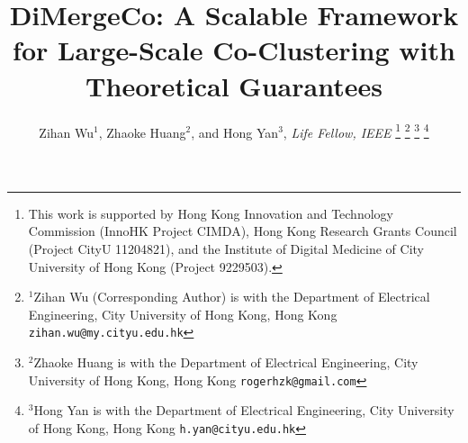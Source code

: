 \documentclass[journal]{IEEEtran}
\theoremstyle{definition}
\theoremstyle{remark} %
\begin{document}
\title{\LARGE \bf DiMergeCo: A Scalable Framework for Large-Scale Co-Clustering with Theoretical Guarantees}


\author{Zihan Wu$^{1}$, Zhaoke Huang$^{2}$, and Hong Yan$^{3}$, \textit{Life Fellow, IEEE}%
    \thanks{This work is supported by Hong Kong Innovation and
        Technology Commission (InnoHK Project CIMDA), Hong
        Kong Research Grants Council (Project CityU 11204821), and the Institute of Digital Medicine of City University of Hong Kong (Project 9229503). }%
    \thanks{$^{1}$Zihan Wu (Corresponding Author) is with the Department of Electrical Engineering,
        City University of Hong Kong, Hong Kong
            {\tt\small zihan.wu@my.cityu.edu.hk}}%
    \thanks{$^{2}$Zhaoke Huang is with the Department of Electrical Engineering,
        City University of Hong Kong, Hong Kong
            {\tt\small rogerhzk@gmail.com}}%
    \thanks{$^{3}$Hong Yan is with the Department of Electrical Engineering,
        City University of Hong Kong, Hong Kong
            {\tt\small h.yan@cityu.edu.hk}}%
}
\maketitle
\end{document}
